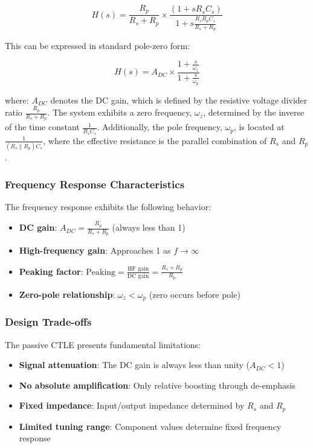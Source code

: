 \[
H(s) = \frac{R_p}{R_s + R_p} \times \frac{(1 + sR_sC_s)}{1 + s\frac{R_sR_pC_s}{R_s + R_p}}
\]

This can be expressed in standard pole-zero form:

\[
H(s) = A_{DC} \times \frac{1 + \frac{s}{\omega_z}}{1 + \frac{s}{\omega_p}}
\]

where: $A_{DC}$ denotes the DC gain, which is defined by the resistive voltage divider ratio $\frac{R_p}{R_s + R_p}$. The system exhibits a zero frequency, $\omega_z$, determined by the inverse of the time constant $\frac{1}{R_s C_s}$. Additionally, the pole frequency, $\omega_p$, is located at $\frac{1}{(R_s \parallel R_p)C_s}$, where the effective resistance is the parallel combination of $R_s$ and $R_p$.

\subsubsection*{Frequency Response Characteristics}

The frequency response exhibits the following behavior:

\begin{itemize}
    \item \textbf{DC gain}: $A_{DC} = \frac{R_p}{R_s + R_p}$ (always less than 1)
    \item \textbf{High-frequency gain}: Approaches 1 as $f \rightarrow \infty$
    \item \textbf{Peaking factor}: $\text{Peaking} = \frac{\text{HF gain}}{\text{DC gain}} = \frac{R_s + R_p}{R_p}$
    \item \textbf{Zero-pole relationship}: $\omega_z < \omega_p$ (zero occurs before pole)
\end{itemize}

\subsubsection*{Design Trade-offs}

The passive CTLE presents fundamental limitations:

\begin{itemize}
    \item \textbf{Signal attenuation}: The DC gain is always less than unity ($A_{DC} < 1$)
    \item \textbf{No absolute amplification}: Only relative boosting through de-emphasis
    \item \textbf{Fixed impedance}: Input/output impedance determined by $R_s$ and $R_p$
    \item \textbf{Limited tuning range}: Component values determine fixed frequency response
\end{itemize}

\newpage